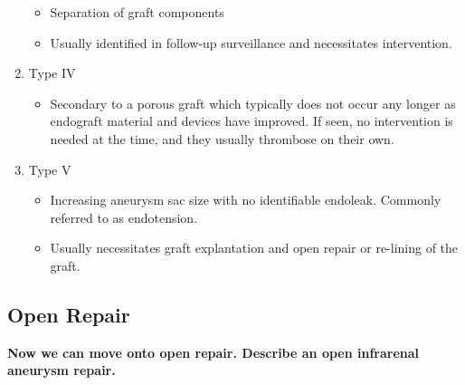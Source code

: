 \documentclass[
]{book}
\providecommand{\tightlist}{%
  \setlength{\itemsep}{0pt}\setlength{\parskip}{0pt}}
\begin{document}
\begin{enumerate}
  \begin{itemize}
  \item
    Separation of graft components
  \item
    Usually identified in follow-up surveillance and necessitates
    intervention.
  \end{itemize}
\item
  Type IV

  \begin{itemize}
  \tightlist
  \item
    Secondary to a porous graft which typically does not occur any
    longer as endograft material and devices have improved. If seen,
    no intervention is needed at the time, and they usually
    thrombose on their own.
  \end{itemize}
\item
  Type V

  \begin{itemize}
  \item
    Increasing aneurysm sac size with no identifiable endoleak.
    Commonly referred to as endotension.
  \item
    Usually necessitates graft explantation and open repair or
    re-lining of the graft.
  \end{itemize}
\end{enumerate}

\hypertarget{open-repair}{%
\subsection{Open Repair}\label{open-repair}}

\textbf{Now we can move onto open repair. Describe an open infrarenal aneurysm
repair.} \citep{mooreVascularEndovascularSurgery2019, garygwindAnatomicExposuresVascular2013}
\end{document}
